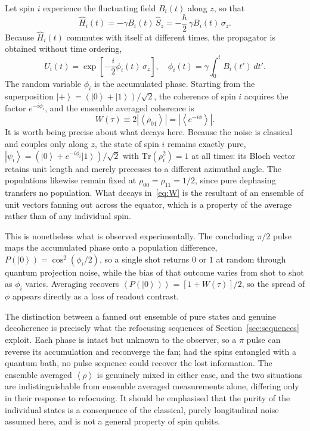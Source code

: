 \documentclass[conference]{IEEEtran}
\newcommand{\ket}[1]{\left|#1\right\rangle}
\newcommand{\avg}[1]{\left\langle#1\right\rangle}
\begin{document}
Let spin $i$ experience the fluctuating field $B_i(t)$ along $z$, so that
\begin{equation}
\hat{H}_i(t) = -\gamma B_i(t)\,\hat{S}_z
= -\frac{\hbar}{2}\,\gamma B_i(t)\,\sigma_z .
\end{equation}
Because $\hat{H}_i(t)$ commutes with itself at different times, the propagator is
obtained without time ordering,
\begin{equation}
\hat{U}_i(t) = \exp\left[-\frac{i}{2}\phi_i(t)\,\sigma_z\right], \quad
\phi_i(t) = \gamma\!\int_0^t\! B_i(t')\,dt' .
\label{eq:phase}
\end{equation}
The random variable $\phi_i$ is the accumulated phase. Starting from the
superposition $\ket{+}=(\ket{0}+\ket{1})/\sqrt{2}$, the coherence of spin $i$
acquires the factor $e^{-i\phi_i}$, and the ensemble averaged coherence is
\begin{equation}
W(\tau) \equiv 2\left|\avg{\rho_{01}}\right| = \left|\avg{e^{-i\phi}}\right| .
\label{eq:W}
\end{equation}
It is worth being precise about what decays here. Because the noise is classical
and couples only along $z$, the state of spin $i$ remains exactly pure,
$\ket{\psi_i} = (\ket{0} + e^{-i\phi_i}\ket{1})/\sqrt{2}$ with
$\mathrm{Tr}(\rho_i^2) = 1$ at all times: its Bloch vector retains unit length and
merely precesses to a different azimuthal angle. The populations likewise remain
fixed at $\rho_{00} = \rho_{11} = 1/2$, since pure dephasing transfers no
population. What decays in~\eqref{eq:W} is the resultant of an ensemble of unit
vectors fanning out across the equator, which is a property of the average rather
than of any individual spin.

This is nonetheless what is observed experimentally. The concluding $\pi/2$ pulse
maps the accumulated phase onto a population difference,
$P(\ket{0}) = \cos^2(\phi_i/2)$, so a single shot returns $0$ or $1$ at random
through quantum projection noise, while the bias of that outcome varies from shot
to shot as $\phi_i$ varies. Averaging recovers
$\avg{P(\ket{0})} = [1 + W(\tau)]/2$, so the spread of $\phi$ appears directly as a
loss of readout contrast.

The distinction between a fanned out ensemble of pure states and genuine
decoherence is precisely what the refocusing sequences of
Section~\ref{sec:sequences} exploit. Each phase is intact but unknown to the
observer, so a $\pi$ pulse can reverse its accumulation and reconverge the fan; had
the spins entangled with a quantum bath, no pulse sequence could recover the lost
information. The ensemble averaged $\avg{\rho}$ is genuinely mixed in either case,
and the two situations are indistinguishable from ensemble averaged measurements
alone, differing only in their response to refocusing. It should be emphasised that
the purity of the individual states is a consequence of the classical, purely
longitudinal noise assumed here, and is not a general property of spin qubits.
\end{document}
